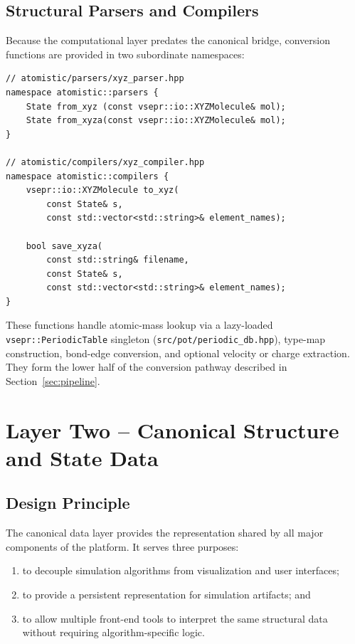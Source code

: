 ﻿\documentclass[11pt]{article}
\newcommand{\file}[1]{\texttt{#1}}
\newcommand{\type}[1]{\texttt{#1}}
\begin{document}
\subsection{Structural Parsers and Compilers}

Because the computational layer predates the canonical bridge, conversion
functions are provided in two subordinate namespaces:

\begin{lstlisting}
// atomistic/parsers/xyz_parser.hpp
namespace atomistic::parsers {
    State from_xyz (const vsepr::io::XYZMolecule& mol);
    State from_xyza(const vsepr::io::XYZMolecule& mol);
}

// atomistic/compilers/xyz_compiler.hpp
namespace atomistic::compilers {
    vsepr::io::XYZMolecule to_xyz(
        const State& s,
        const std::vector<std::string>& element_names);

    bool save_xyza(
        const std::string& filename,
        const State& s,
        const std::vector<std::string>& element_names);
}
\end{lstlisting}

These functions handle atomic-mass lookup via a lazy-loaded
\type{vsepr::PeriodicTable} singleton (\file{src/pot/periodic\_db.hpp}),
type-map construction, bond-edge conversion, and optional velocity or charge
extraction. They form the lower half of the conversion pathway described in
Section~\ref{sec:pipeline}.
\section{Layer Two -- Canonical Structure and State Data}

\subsection{Design Principle}

The canonical data layer provides the representation shared by all major
components of the platform. It serves three purposes:

\begin{enumerate}
  \item to decouple simulation algorithms from visualization and user
        interfaces;
  \item to provide a persistent representation for simulation artifacts; and
  \item to allow multiple front-end tools to interpret the same structural
        data without requiring algorithm-specific logic.
\end{enumerate}
\end{document}

